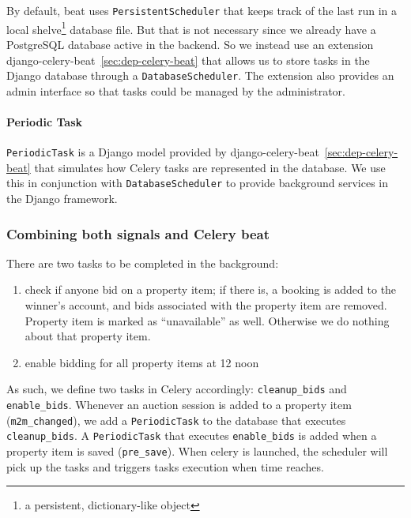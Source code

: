 By default, beat uses \texttt{PersistentScheduler} that keeps track of the last
run in a local shelve\footnote{a persistent, dictionary-like object} database
file. But that is not necessary since we already have a PostgreSQL database
active in the backend. So we instead use an extension
django-celery-beat~\ref{sec:dep-celery-beat} that allows us to store tasks in
the Django database through a \texttt{DatabaseScheduler}. The extension also
provides an admin interface so that tasks could be managed by the administrator.

\paragraph{Periodic Task}
\texttt{PeriodicTask} is a Django model provided by
django-celery-beat~\ref{sec:dep-celery-beat} that simulates how Celery tasks are
represented in the database. We use this in conjunction with
\texttt{DatabaseScheduler} to provide background services in the Django
framework.

\subsubsection{Combining both signals and Celery beat}
There are two tasks to be completed in the background:
\begin{enumerate}
  \item check if anyone bid on a property item; if there is, a booking is added
    to the winner's account, and bids associated with the property item are
    removed. Property item is marked as ``unavailable'' as well. Otherwise we do
    nothing about that property item.
  \item enable bidding for all property items at 12 noon
\end{enumerate}
As such, we define two tasks in Celery accordingly: \texttt{cleanup\_bids} and
\texttt{enable\_bids}. Whenever an auction session is added to a property item
(\texttt{m2m\_changed}), we add a \texttt{PeriodicTask} to the database that
executes \texttt{cleanup\_bids}. A \texttt{PeriodicTask} that executes
\texttt{enable\_bids} is added when a property item is
saved (\texttt{pre\_save}). When celery is launched, the scheduler will pick up
the tasks and triggers tasks execution when time reaches.
